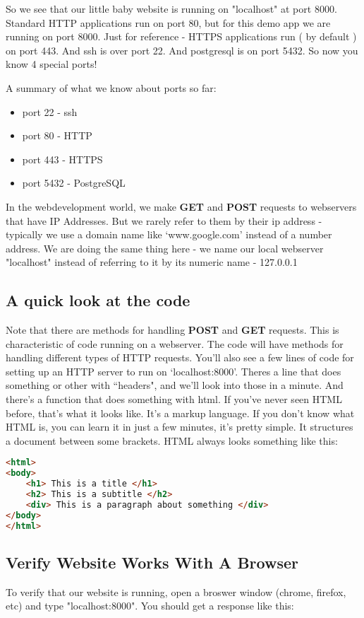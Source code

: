 \documentclass[10pt]{article}
\begin{document}
So we see that our little baby website is running on "localhost" at port 8000. Standard HTTP applications run on port 80, but for this demo app we are running on port 8000. Just for reference - HTTPS applications run ( by default ) on port 443. And ssh is over port 22. And postgresql is on port 5432. So now you know 4 special ports!

A summary of what we know about ports so far:
\begin{itemize}
\item port 22 - ssh
\item port 80 - HTTP
\item port 443 - HTTPS
\item port 5432 - PostgreSQL
\end{itemize}

In the webdevelopment world, we make \textbf{GET} and \textbf{POST} requests to webservers that have IP Addresses. But we rarely refer to them by their ip address - typically we use a domain name like `www.google.com' instead of a number address. We are doing the same thing here - we name our local webserver "localhost" instead of referring to it by its numeric name - 127.0.0.1 

\subsection{A quick look at the code}

Note that there are methods for handling \textbf{POST} and \textbf{GET} requests. This is characteristic of code running on a webserver. The code will have methods for handling different types of HTTP requests. You'll also see a few lines of code for setting up an HTTP server to run on `localhost:8000'. Theres a line that does something or other with ``headers", and we'll look into those in a minute. And there's a function that does something with html. If you've never seen HTML before, that's what it looks like. It's a markup language. If you don't know what HTML is, you can learn it in just a few minutes, it's pretty simple. It structures a document between some brackets. HTML always looks something like this:

\begin{lstlisting}[language=HTML]
<html>
<body>
	<h1> This is a title </h1>
	<h2> This is a subtitle </h2>
	<div> This is a paragraph about something </div>
</body>
</html>
\end{lstlisting}

\subsection{Verify Website Works With A Browser}
To verify that our website is running, open a broswer window (chrome, firefox, etc) and type "localhost:8000". You should get a response like this:
\end{document}
